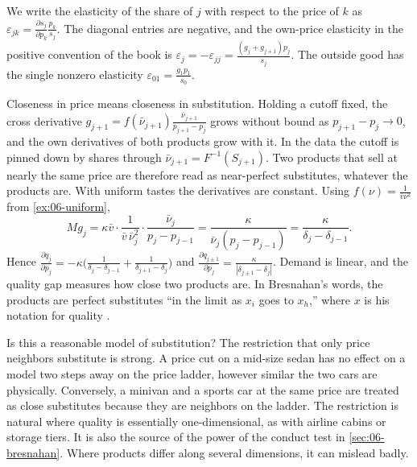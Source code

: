 We write the elasticity of the share of $j$ with respect to the price of $k$ as
$\varepsilon_{jk} = \frac{\partial s_j}{\partial p_k}\frac{p_k}{s_j}$. The diagonal entries are negative, and the
own-price elasticity in the positive convention of the book is $\varepsilon_j = -\varepsilon_{jj} =
\frac{(g_j + g_{j+1})p_j}{s_j}$. The outside good has the single nonzero elasticity
$\varepsilon_{01} = \frac{g_1 p_1}{s_0}$.

Closeness in price means closeness in substitution. Holding a cutoff fixed, the cross derivative
$g_{j+1} = f(\bar\nu_{j+1})\frac{\bar\nu_{j+1}}{p_{j+1} - p_j}$ grows without bound as $p_{j+1} - p_j \to 0$, and the
own derivatives of both products grow with it. In the data the cutoff is pinned down by shares through
$\bar\nu_{j+1} = F^{-1}(S_{j+1})$. Two products that sell at nearly the same price are therefore read as
near-perfect substitutes, whatever the products are. With uniform tastes the derivatives are constant.
Using $f(\nu) = \frac{1}{\bar v\nu^2}$ from \cref{ex:06-uniform},
\begin{equation*}
  M g_j = \kappa\bar v\cdot\frac{1}{\bar v\,\bar\nu_j^2}\cdot\frac{\bar\nu_j}{p_j - p_{j-1}}
        = \frac{\kappa}{\bar\nu_j(p_j - p_{j-1})} = \frac{\kappa}{\delta_j - \delta_{j-1}} .
\end{equation*}
Hence $\frac{\partial q_j}{\partial p_j} = -\kappa\big(\frac{1}{\delta_j - \delta_{j-1}} + \frac{1}{\delta_{j+1} - \delta_j}\big)$
and $\frac{\partial q_{j\pm1}}{\partial p_j} = \frac{\kappa}{|\delta_{j\pm1} - \delta_j|}$. Demand is linear, and the
quality gap measures how close two products are. In Bresnahan's words, the products are perfect
substitutes ``in the limit as $x_i$ goes to $x_h$,'' where $x$ is his notation for quality
\citep[p.~462]{Bresnahan1987}.

Is this a reasonable model of substitution? The restriction that only price neighbors substitute is
strong. A price cut on a mid-size sedan has no effect on a model two steps away on the price ladder,
however similar the two cars are physically. Conversely, a minivan and a sports car at the same price are
treated as close substitutes because they are neighbors on the ladder. The restriction is natural where
quality is essentially one-dimensional, as with airline cabins or storage tiers. It is also the source of
the power of the conduct test in \cref{sec:06-bresnahan}. Where products differ along several dimensions,
it can mislead badly.

